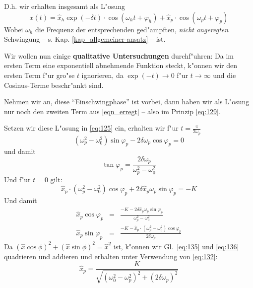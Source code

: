 D.h. wir erhalten insgesamt als L"osung
\begin{equation}
   \label{eqn_erregt}
\boxed{   x(t) = \hat x_h \exp(-\delta t) \cdot \cos(\omega_h t + \varphi_h)
   + \hat x_p \cdot \cos (\omega_p t + \varphi_p) }
\end{equation}
Wobei  $\omega_h$ die Frequenz der entsprechenden ged"ampften,
\emph{nicht angeregten} Schwingung --
s. Kap. \ref{kap_allgemeiner-ansatz} -- ist.

Wir wollen nun einige \textbf{qualitative Untersuchungen} durchf"uhren:
Da im ersten Term eine exponentiell abnehmende Funktion steckt,
k"onnen wir den ersten Term f"ur gro"se $t$ ignorieren, da $\exp(-t)
\to 0$ f"ur $t \to \infty$ und die Cosinus-Terme beschr"ankt sind.

Nehmen wir an, diese "`Einschwingphase"' ist vorbei, dann haben wir
als L"osung nur noch den zweiten Term aus \eqref{eqn_erregt} -- also im
Prinzip \eqref{eq:129}.

Setzen wir diese L"osung in \eqref{eq:125} ein, erhalten wir f"ur $t =
\frac{\pi}{2 \omega_p}$
\begin{equation}
   \label{eq:132}
   \left ( \omega_p^2 - \omega_0^2 \right ) \sin \varphi_p - 2 \delta
   \omega_p \cos \varphi_p = 0
\end{equation}
und damit
\begin{equation}
   \label{eq:134}
 \tan \varphi_p =      \frac{ 2 \delta
   \omega_p}{  \omega_p^2 - \omega_0^2 }
\end{equation}
Und f"ur $t = 0$ gilt:
\begin{equation}
   \label{eq:133}
  \hat x_p \cdot  (\omega_p^2 - \omega_0^2) \cos \varphi_p + 2 \delta
  \hat x_p \omega_p \sin\varphi_p = -K
\end{equation}
Und damit
\begin{eqnarray}
   \label{eq:135}
   \hat x_p \cos \varphi_p &=& \frac{-K - 2 \delta
  \hat x_p \omega_p \sin\varphi_p}{\omega_p^2 - \omega_0^2} \\
\label{eq:136}
\hat x_p \sin \varphi_p &=& \frac{-K - \hat x_p \cdot \left ( \omega_p^2 -
   \omega_0^2 \right ) \cos \varphi_p }{2 \delta \omega_p}
\end{eqnarray}
Da $(\hat x \cos \phi)^2 + (\hat x \sin \phi)^2 = {\hat x}^2$ ist,
k"onnen wir Gl.~\eqref{eq:135} und \eqref{eq:136}  quadrieren und
addieren und erhalten unter Verwendung von \eqref{eq:132}: 
\begin{equation}
   \label{eq:137}
   \hat x_p = \frac{K}{\sqrt{(\omega_0^2 - \omega_p^2)^2 + (2\delta\omega_p)^2}}
\end{equation}













